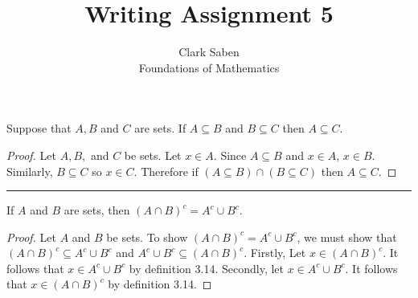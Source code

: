 \documentclass[12pt]{article}
\newenvironment{theorem}[2][Theorem]{\begin{trivlist}
\item[\hskip \labelsep {\bfseries #1}\hskip \labelsep {\bfseries #2.}]}{\end{trivlist}}
\begin{document}
 
 
\title{Writing Assignment 5}%
\author{Clark Saben\\ %
Foundations of Mathematics} %
 
\maketitle

 
\begin{theorem}{3.10}
	Suppose that $A, B$ and $C$ are sets. If $A \subseteq B$ and $B \subseteq C$ then $A \subseteq C$.
\end{theorem}
\begin{proof}
	Let $A, B,$ and $C$ be sets. Let $x \in A$. Since $A \subseteq B$ and $x \in A$, $x \in B$. Similarly,
	$B \subseteq C$ so $x \in C$. Therefore if $\left(A \subseteq B \right) \cap  \left(B \subseteq C \right)$ then $A \subseteq C$.
\end{proof}

\hrule

\begin{theorem}{3.21b}
	If $A$ and $B$ are sets, then $\left(A \cap B \right)^{c} = A^{c} \cup B^{c}$.
\end{theorem}
\begin{proof}
	Let $A$ and $B$ be sets. To show  $\left(A \cap B \right)^{c} = A^{c} \cup B^{c}$,
	we must show that $\left(A \cap B \right)^{c} \subseteq A^{c} \cup B^{c}$ and $A^{c} \cup B^{c} \subseteq \left(A \cap B \right)^{c}$.
	Firstly,  Let $x \in (A \cap B)^c$. It follows that $x \in A^c \cup B^c$ by definition 3.14.
	Secondly, let $x \in A^c \cup B^c$. It follows that $x \in (A \cap B)^c$ by definition 3.14.
\end{proof}


    



 
 
\end{document}
